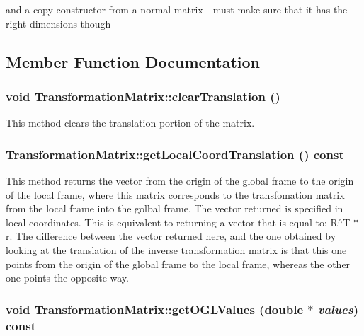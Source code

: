 \label{classCartWheel_1_1Math_1_1TransformationMatrix_ad1e2732727abf1943a5ef9443f19eb61}
and a copy constructor from a normal matrix -\/ must make sure that it has the right dimensions though 

\subsection{Member Function Documentation}
\hypertarget{classCartWheel_1_1Math_1_1TransformationMatrix_abbb6ded35e00d541ba4d00d278d6bbb1}{
\subsubsection[{clearTranslation}]{\setlength{\rightskip}{0pt plus 5cm}void TransformationMatrix::clearTranslation ()}}
\label{classCartWheel_1_1Math_1_1TransformationMatrix_abbb6ded35e00d541ba4d00d278d6bbb1}
This method clears the translation portion of the matrix. \hypertarget{classCartWheel_1_1Math_1_1TransformationMatrix_aced5f0672d1827854bf5fad2a2e0ed15}{
\subsubsection[{getLocalCoordTranslation}]{ TransformationMatrix::getLocalCoordTranslation () const}}
\label{classCartWheel_1_1Math_1_1TransformationMatrix_aced5f0672d1827854bf5fad2a2e0ed15}
This method returns the vector from the origin of the global frame to the origin of the local frame, where this matrix corresponds to the transfomation matrix from the local frame into the golbal frame. The vector returned is specified in local coordinates. This is equivalent to returning a vector that is equal to: R$^\wedge$T $\ast$ r. The difference between the vector returned here, and the one obtained by looking at the translation of the inverse transformation matrix is that this one points from the origin of the global frame to the local frame, whereas the other one points the opposite way. \hypertarget{classCartWheel_1_1Math_1_1TransformationMatrix_a0edba5cf54cf8c0330acdfcedaf664f2}{
\subsubsection[{getOGLValues}]{\setlength{\rightskip}{0pt plus 5cm}void TransformationMatrix::getOGLValues (double $\ast$ {\em values}) const}}
